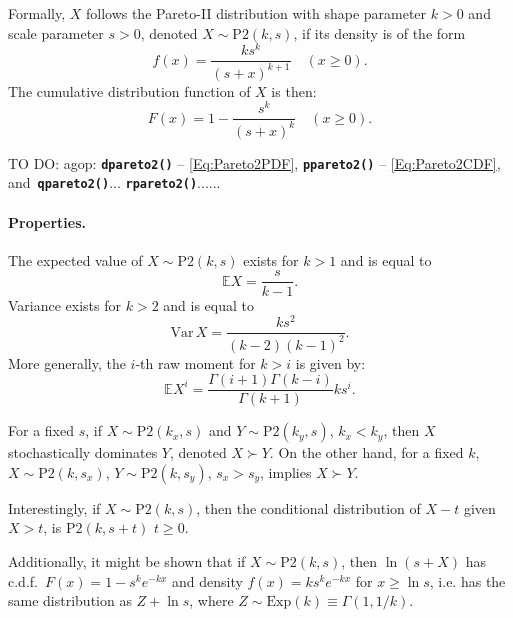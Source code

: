 \documentclass[11pt]{article}\usepackage{graphicx, color}
\newcommand{\hlfunctioncall}[1]{\textcolor[rgb]{0.501960784313725,0,0.329411764705882}{\textbf{#1}}}%
\newcommand{\package}[1]{\textsf{#1}\xspace}
\newcommand{\Rfunc}[1]{\texttt{\hlfunctioncall{#1}}}
\theoremstyle{remark}
\theoremstyle{definition}
\begin{document}
Formally, $X$ follows the Pareto-II distribution
with shape parameter $k>0$ and scale parameter $s>0$, 
denoted $X\sim\mathrm{P2}(k,s)$, if its density is of the form
\begin{equation}\label{Eq:Pareto2PDF}
   f(x)=\frac{k s^k}{(s+x)^{k+1}}\quad (x\ge 0).
\end{equation}
The cumulative distribution function of $X$ is then:
\begin{equation}\label{Eq:Pareto2CDF}
   F(x) = 1-\dfrac{s^k}{(s+x)^k}\quad (x\ge 0).
\end{equation}

TO DO: \package{agop}: \Rfunc{dpareto2()} -- \eqref{Eq:Pareto2PDF},
\Rfunc{ppareto2()} -- \eqref{Eq:Pareto2CDF},
and~\Rfunc{qpareto2()}... \Rfunc{rpareto2()}......

\paragraph{Properties.}
The expected value of $X\sim\mathrm{P2}(k,s)$
exists for $k>1$ and is equal to 
\[\mathbb{E}X = \frac{s}{k-1}.\]
Variance exists for $k>2$ and is equal to
\[\mathrm{Var}\, X = \frac{ks^2}{(k-2)(k-1)^2}.\]
More generally, the $i$-th raw moment for $k>i$ is given by:
\[\mathbb{E}X^i = \frac{\Gamma(i+1)\Gamma(k-i)}{\Gamma(k+1)} ks^i.\]

For a fixed $s$, if $X\sim \mathrm{P2}(k_x,s)$ and $Y\sim \mathrm{P2}(k_y,s)$,
$k_x<k_y$, then $X$ stochastically dominates $Y$,
denoted $X\succ Y$.
On the other hand, for a fixed $k$, $X\sim \mathrm{P2}(k,s_x)$, $Y\sim \mathrm{P2}(k,s_y)$, $s_x>s_y$,
implies $X \succ Y$.

Interestingly, if $X\sim\mathrm{P2}(k,s)$,
then the conditional distribution of $X-t$ given $X>t$,
is $\mathrm{P2}(k,s+t)$ $t \ge 0$.

Additionally, it might be shown that if $X\sim\mathrm{P2}(k,s)$, 
then $\ln(s+X)$ has c.d.f.~$F(x)=1-s^k e^{-kx}$ and
density $f(x)=k s^k e^{-kx}$ for $x\ge\ln s$,
i.e. has the same distribution as $Z+\ln s$, where
$Z\sim\mathrm{Exp}(k)\equiv \Gamma(1,1/k)$.
\end{document}
